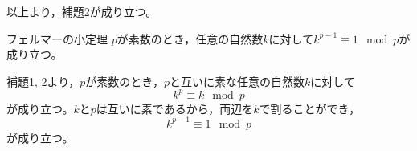 \documentclass{article}
\begin{document}
以上より，補題2が成り立つ。

\begin{itembox}[l]{フェルマーの小定理}
    $p$が素数のとき，任意の自然数$k$に対して$k^{p - 1} \equiv 1 \mod{p}$が成り立つ。
\end{itembox}

補題1, 2より，$p$が素数のとき，$p$と互いに素な任意の自然数$k$に対して
\begin{equation*}
    k^p \equiv k \mod{p}
\end{equation*}
が成り立つ。$k$と$p$は互いに素であるから，両辺を$k$で割ることができ，
\begin{equation*}
    k^{p - 1} \equiv 1 \mod{p}
\end{equation*}
が成り立つ。
\end{document}
